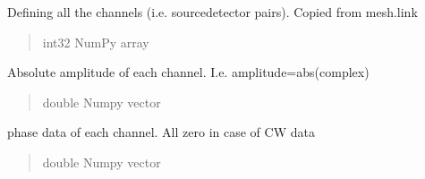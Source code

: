 \documentclass[letterpaper,10pt,english]{sphinxmanual}
\begin{document}
\begin{fulllineitems}
\begin{fulllineitems}
\label{\detokenize{_autosummary/nirfasterff.base.data.FDdata:nirfasterff.base.data.FDdata.link}}
\pysigstartsignatures
{}
\pysigstopsignatures
\sphinxAtStartPar
Defining all the channels (i.e. source\sphinxhyphen{}detector pairs). Copied from mesh.link
\begin{quote}\begin{description}
\sphinxAtStartPar
int32 NumPy array

\end{description}\end{quote}

\end{fulllineitems}


\begin{fulllineitems}
\label{\detokenize{_autosummary/nirfasterff.base.data.FDdata:nirfasterff.base.data.FDdata.amplitude}}
\pysigstartsignatures
{}
\pysigstopsignatures
\sphinxAtStartPar
Absolute amplitude of each channel. I.e. amplitude=abs(complex)
\begin{quote}\begin{description}
\sphinxAtStartPar
double Numpy vector

\end{description}\end{quote}

\end{fulllineitems}


\begin{fulllineitems}
\label{\detokenize{_autosummary/nirfasterff.base.data.FDdata:nirfasterff.base.data.FDdata.phase}}
\pysigstartsignatures
{}
\pysigstopsignatures
\sphinxAtStartPar
phase data of each channel. All zero in case of CW data
\begin{quote}\begin{description}
\sphinxAtStartPar
double Numpy vector

\end{description}\end{quote}


\end{fulllineitems}
\end{fulllineitems}
\end{document}
